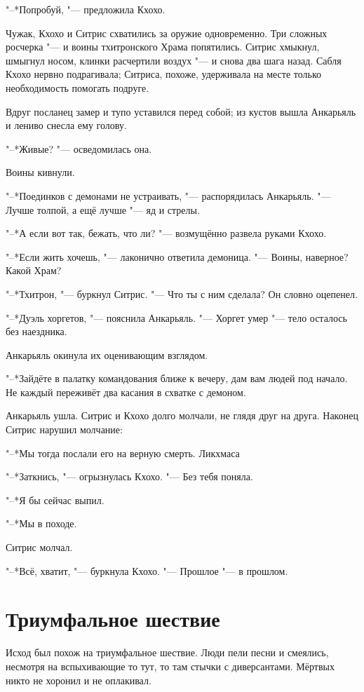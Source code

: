 \documentclass[a4paper,10pt,fleqn]{book}
\newcommand{\ldotst}{\so{...}\xspace}
\begin{document}
"--*Попробуй, "--- предложила Кхохо.

Чужак, Кхохо и Ситрис схватились за оружие одновременно.
Три сложных росчерка "--- и воины тхитронского Храма попятились.
Ситрис хмыкнул, шмыгнул носом, клинки расчертили воздух "--- и снова два шага назад.
Сабля Кхохо нервно подрагивала;
Ситриса, похоже, удерживала на месте только необходимость помогать подруге.

Вдруг посланец замер и тупо уставился перед собой;
из кустов вышла Анкарьяль и лениво снесла ему голову.

"--*Живые? "--- осведомилась она.

Воины кивнули.

"--*Поединков с демонами не устраивать, "--- распорядилась Анкарьяль.
"--- Лучше толпой, а ещё лучше "--- яд и стрелы.

"--*А если вот так, бежать, что ли? "--- возмущённо развела руками Кхохо.

"--*Если жить хочешь, "--- лаконично ответила демоница.
"--- Воины, наверное?
Какой Храм?

"--*Тхитрон, "--- буркнул Ситрис.
"--- Что ты с ним сделала?
Он словно оцепенел.

"--*Дуэль хоргетов, "--- пояснила Анкарьяль.
"--- Хоргет умер "--- тело осталось без наездника.

Анкарьяль окинула их оценивающим взглядом.

"--*Зайдёте в палатку командования ближе к вечеру, дам вам людей под начало.
Не каждый переживёт два касания в схватке с демоном.

Анкарьяль ушла.
Ситрис и Кхохо долго молчали, не глядя друг на друга.
Наконец Ситрис нарушил молчание:

"--*Мы тогда послали его на верную смерть.
Ликхмаса\ldotst

"--*Заткнись, "--- огрызнулась Кхохо.
"--- Без тебя поняла.

"--*Я бы сейчас выпил.

"--*Мы в походе.

Ситрис молчал.

"--*Всё, хватит, "--- буркнула Кхохо.
"--- Прошлое "--- в прошлом.

\section{Триумфальное шествие}

Исход был похож на триумфальное шествие.
Люди пели песни и смеялись, несмотря на вспыхивающие то тут, то там стычки с диверсантами.
Мёртвых никто не хоронил и не оплакивал.
\end{document}
